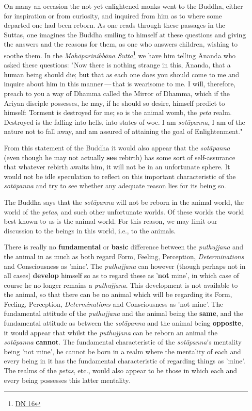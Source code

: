 On many an occasion the not yet enlightened monks went to the Buddha, either for inspiration or from curiosity, and inquired from him as to where some departed one had been reborn. As one reads through these passages in the Suttas, one imagines the Buddha smiling to himself at these questions and giving the answers and the reasons for them, as one who answers children, wishing to soothe them. In the \emph{Mahāparinibbāna Sutta}\footnote{\href{https://suttacentral.net/dn16/en/bodhi}{DN 16}} we have him telling Ānanda who asked these questions: "Now there is nothing strange in this, Ānanda, that a human being should die; but that as each one does you should come to me and inquire about him in this manner --- that is wearisome to me. I will, therefore, preach to you a way of Dhamma called the Mirror of Dhamma, which if the Ariyan disciple possesses, he may, if he should so desire, himself predict to himself: Torment is destroyed for me; so is the animal womb, the \emph{peta} realm. Destroyed is the falling into hells, into states of woe. I am \emph{sotāpanna}, I am of the nature not to fall away, and am assured of attaining the goal of Enlightenment."

From this statement of the Buddha it would also appear that the \emph{sotāpanna} (even though he may not actually \textbf{see} rebirth) has some sort of self-assurance that whatever rebirth awaits him, it will not be in an unfortunate sphere. It would not be idle speculation to reflect on this important characteristic of the \emph{sotāpanna} and try to see whether any adequate reason lies for its being so.

The Buddha says that the \emph{sotāpanna} will not be reborn in the animal world, the world of the \emph{petas}, and such other unfortunate worlds. Of these worlds the world best known to us is the animal world. For this reason, we may limit our discussion to the beings in this world, i.e., to the animals.

There is really no \textbf{fundamental} or \textbf{basic} difference between the \emph{puthujjana} and the animal in as much as both regard Form, Feeling, Perception, \emph{Determinations} and Consciousness as 'mine'. The \emph{puthujjana} can however (though perhaps not in all cases) \textbf{develop} himself so as to regard these as '\textbf{not} mine', in which case of course he no longer remains a \emph{puthujjana}. This development is not available to the animal, so that there can be no animal which will be regarding its Form, Feeling, Perception, \emph{Determinations} and Consciousness as 'not mine'. The fundamental attitude of the \emph{puthujjana} and the animal being the \textbf{same}, and the fundamental attitude as between the \emph{sotāpanna} and the animal being \textbf{opposite}, it would appear that whilst the \emph{puthujjana} can be reborn an animal the \emph{sotāpanna} \textbf{cannot}. The fundamental characteristic of the \emph{sotāpanna}'s mentality being 'not mine', he cannot be born in a realm where the mentality of each and every being in it has the fundamental characteristic of regarding things as 'mine'. The realms of the \emph{petas}, etc., would also appear to be those in which each and every being possesses this latter mentality.

